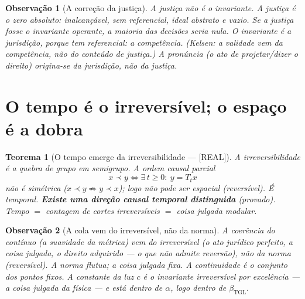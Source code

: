 \documentclass[11pt,a4paper]{article}
\newcommand{\REAL}{\textsf{[REAL]}}
\newcommand{\bTGL}{\beta_{\mathrm{TGL}}}
\newtheorem{theorem}{Teorema}
\newtheorem{remark}{Observação}
\begin{document}
\begin{remark}[A correção da justiça]
A justiça \emph{não} é o invariante. A justiça é o zero absoluto:
inalcançável, sem referencial, ideal abstrato e vazio. Se a justiça fosse o
invariante operante, a maioria das decisões seria nula. O invariante é a
\emph{jurisdição}, porque tem referencial: a competência. (Kelsen: a validade
vem da competência, não do conteúdo de justiça.) A pronúncia (o ato de
projetar/dizer o direito) origina-se da jurisdição, não da justiça.
\end{remark}

\section{O tempo é o irreversível; o espaço é a dobra}\label{sec:tempo-espaco}
\begin{theorem}[O tempo emerge da irreversibilidade --- \REAL]
A irreversibilidade é a quebra de grupo em semigrupo. A ordem causal parcial
\begin{equation}
x\prec y \iff \exists\,t\ge0:\ y=T_t x
\end{equation}
não é simétrica ($x\prec y\not\Rightarrow y\prec x$); logo não pode ser
espacial (reversível). É temporal. \textbf{Existe uma direção causal
temporal distinguida} (provado). \emph{Tempo $=$ contagem de cortes
irreversíveis $=$ coisa julgada modular.}
\end{theorem}

\begin{remark}[A cola vem do irreversível, não da norma]
A coerência do contínuo (a suavidade da métrica) vem do \emph{irreversível}
(o ato jurídico perfeito, a coisa julgada, o direito adquirido --- o que não
admite reversão), não da norma (reversível). A norma flutua; a coisa julgada
fixa. A continuidade é o conjunto dos pontos fixos. A constante da luz $c$ é
o invariante irreversível por excelência --- a coisa julgada da física ---
e está dentro de $\alpha$, logo dentro de $\bTGL$.
\end{remark}
\end{document}
